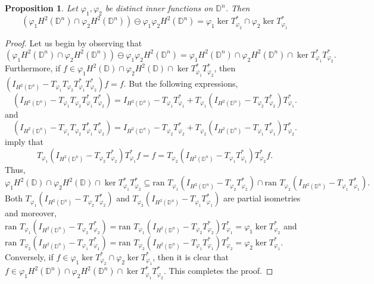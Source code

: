 \documentclass[12pt, a4 paper]{amsart}
\newcommand{\D}{\mathbb{D}}
\theoremstyle{definition}
\theoremstyle{plain}
\newtheorem{prop}[thm]{Proposition}
\theoremstyle{definition}
\numberwithin{equation}{section}
\let\phi=\varphi
\begin{document}
\begin{prop}\label{lcm}
Let $\phi_1, \phi_2$ be distinct inner functions on $\D^n$. Then 
\begin{equation*} 
(\phi_1 H^2(\D^n) \cap \phi_2 H^2(\D^n)) \ominus \phi_1 \phi_2 H^2(\D^n) 
=  \phi_{1} \ker T_{\phi_2}^* \cap \phi_2 \ker T_{\phi_1}^* 
\end{equation*}
\end{prop}
\begin{proof}
Let us begin by observing that
\[
(\phi_1 H^2(\D^n) \cap \phi_2 H^2(\D^n)) \ominus \phi_1 \phi_2 H^2(\D^n) = \phi_1 H^2(\D^n) \cap \phi_2 H^2(\D^n) \cap \ker T_{\phi_1}^* T_{\phi_2}^*.
\]
Furthermore, if $f \in \phi_1 H^2(\mathbb{D} )\cap\phi_2 H^2(\mathbb{D} ) \cap \ker T_{\phi_1}^* T_{\phi_2}^* $, then $
(I_{H^2(\D^n)} - T_{\phi_1} T_{\phi_2} T_{\phi_1}^* T_{\phi_2}^*) f = f$.
But the following expressions,
\[
(I_{H^2(\D^n)} - T_{\phi_1} T_{\phi_2} T_{\phi_1}^* T_{\phi_2}^*) = I_{H^2(\D^n)} - T_{\phi_1}T_{\phi_1}^*+ T_{\phi_1}(I_{H^2(\D^n)}  - T_{\phi_2}T_{\phi_2}^*)T_{\phi_1}^*.
 \]
 and 
 \[
(I_{H^2(\D^n)} - T_{\phi_1} T_{\phi_2} T_{\phi_1}^* T_{\phi_2}^*) = I_{H^2(\D^n)} - T_{\phi_2}T_{\phi_2}^*+ T_{\phi_2}(I_{H^2(\D^n)}  - T_{\phi_1}T_{\phi_1}^*)T_{\phi_2}^*.
 \]
imply that
\[
T_{\phi_1}(I_{H^2(\D^n)}  - T_{\phi_2}T_{\phi_2}^*)T_{\phi_1}^* f = f = T_{\phi_2}(I_{H^2(\D^n)}  - T_{\phi_1}T_{\phi_1}^*)T_{\phi_2}^* f.
\]
Thus,
\[
\phi_1 H^2(\mathbb{D} )\cap\phi_2 H^2(\mathbb{D} ) \cap \ker T_{\phi_1}^* T_{\phi_2}^* \subseteq \mbox{ran } T_{\phi_1} (I_{H^2(\D^n)} - T_{\phi_2}T_{\phi_2}^*)  \cap \mbox{ran } T_{\phi_2}(I_{H^2(\D^n)} - T_{\phi_1}T_{\phi_1}^*).
\]
Both $T_{\phi_1} (I_{H^2(\D^n)} - T_{\phi_2}T_{\phi_2}^*)$ and $T_{\phi_2} (I_{H^2(\D^n)} - T_{\phi_1}T_{\phi_1}^*)$  are partial isometries and moreover,
$
\mbox{ran } T_{\phi_1} (I_{H^2(\D^n)} - T_{\phi_2}T_{\phi_2}^*) = \mbox{ran } T_{\phi_1} (I_{H^2(\D^n)} - T_{\phi_2}T_{\phi_2}^*) T_{\phi_1}^* = \phi_1 \ker T_{\phi_2}^*$ and $ \mbox{ran } T_{\phi_2} (I_{H^2(\D^n)} - T_{\phi_1}T_{\phi_1}^*) = \mbox{ran } T_{\phi_2} (I_{H^2(\D^n)} - T_{\phi_1}T_{\phi_1}^*) T_{\phi_2}^* = \phi_2 \ker T_{\phi_1}^*$. Conversely, if $f \in \phi_1 \ker T_{\phi_2}^* \cap \phi_2 \ker T_{\phi_1}^*$, then it is clear that $f \in  \phi_1 H^2(\D^n) \cap \phi_2 H^2(\D^n) \cap \ker T_{\phi_1}^* T_{\phi_2}^*.$ This completes the proof.
\end{proof}
\end{document}
